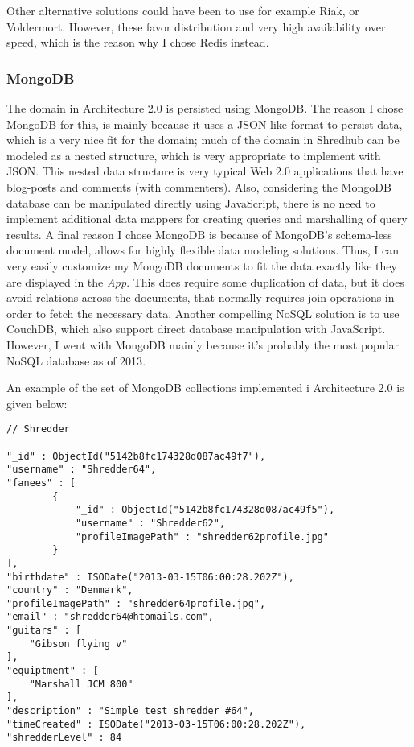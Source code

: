 Other alternative solutions could have been to use for example Riak, or Voldermort. However, these favor distribution and very high availability over speed, which is the reason why I chose Redis instead.

\subsubsection{MongoDB}
The domain in Architecture 2.0 is persisted using MongoDB. The reason I chose MongoDB for this, is mainly because it uses a JSON-like format to persist data, which is a very nice fit for the domain; much of the domain in Shredhub can be modeled as a nested structure, which is very appropriate to implement with JSON. This nested data structure is very typical Web 2.0 applications that have blog-posts and comments (with commenters). Also, considering the MongoDB database can be manipulated directly using JavaScript, there is no need to implement additional data mappers for creating queries and marshalling of query results. A final reason I chose MongoDB is because of MongoDB's schema-less document model, allows for highly flexible data modeling solutions. Thus, I can very easily customize my MongoDB documents to fit the data exactly like they are displayed in the \textit{App}. This does require some duplication of data, but it does avoid relations across the documents, that normally requires join operations in order to fetch the necessary data. Another compelling NoSQL solution is to use CouchDB, which also support direct database manipulation with JavaScript. However, I went with MongoDB mainly because it's probably the most popular NoSQL database as of 2013\cite{mongopopular}.

An example of the set of MongoDB collections implemented i Architecture 2.0 is given below:
\begin{lstlisting}
// Shredder

"_id" : ObjectId("5142b8fc174328d087ac49f7"),
"username" : "Shredder64",
"fanees" : [
		{
			"_id" : ObjectId("5142b8fc174328d087ac49f5"),
			"username" : "Shredder62",
			"profileImagePath" : "shredder62profile.jpg"
		}
],
"birthdate" : ISODate("2013-03-15T06:00:28.202Z"),
"country" : "Denmark",
"profileImagePath" : "shredder64profile.jpg",
"email" : "shredder64@htomails.com",
"guitars" : [
	"Gibson flying v"
],
"equiptment" : [
	"Marshall JCM 800"
],
"description" : "Simple test shredder #64",
"timeCreated" : ISODate("2013-03-15T06:00:28.202Z"),
"shredderLevel" : 84
\end{lstlisting}

